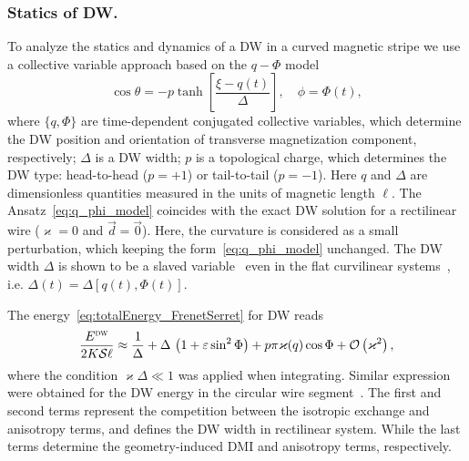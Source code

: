 \documentclass[runningheads]{llncs}
\begin{document}
\subsubsection{Statics of DW.} To analyze the statics and dynamics of a DW in a curved magnetic stripe we use a collective variable approach based on the $q-\Phi$ model~\cite{Slonczewski72,Malozemoff79}
\begin{equation}\label{eq:q_phi_model}
\cos\theta=-p\tanh\left[\frac{\xi-q(t)}{\Delta}\right],\quad\phi=\Phi(t),
\end{equation}
where $\{q, \Phi\}$ are time-dependent conjugated collective variables, which determine the DW position and orientation of transverse magnetization component, respectively; $\Delta$ is a DW width; $p$ is a topological charge, which determines the DW type: head-to-head ($p = +1$) or tail-to-tail ($p = −1$). Here $q$ and $\Delta$ are dimensionless quantities measured in the units of magnetic length $\ell$. The Ansatz~\eqref{eq:q_phi_model} coincides with the exact DW solution for a rectilinear wire ($\varkappa=0$ and $\vec{d}=\vec{0}$). Here, the curvature is considered as a small perturbation, which keeping the form~\eqref{eq:q_phi_model} unchanged. The DW width $\Delta$ is shown to be a slaved variable~\cite{Hillebrands06} even in the flat curvilinear systems~\cite{Yershov18a}, i.e. $\Delta(t) = \Delta\left[q(t),\Phi(t)\right]$.

The energy~\eqref{eq:totalEnergy_FrenetSerret} for DW reads
\begin{equation}\label{eq:dw_energy}
	\frac{E^\textsc{dw}}{2K\mathcal{S}\ell}\approx\frac{1}{\Delta}+\Delta\,\left(1+\varepsilon\sin^2\Phi\right)+p\pi\varkappa(q)\cos\Phi+\mathcal{O}\left(\varkappa^2\right),
\end{equation}
where the condition $\varkappa\Delta\ll1$ was applied when integrating. Similar expression were obtained for the DW energy in the circular wire segment~\cite{Kruger07a}. The first and second terms represent the competition between the isotropic exchange and anisotropy terms, and defines the DW width in rectilinear system. While the last terms determine the geometry-induced DMI and anisotropy terms, respectively.
\end{document}
